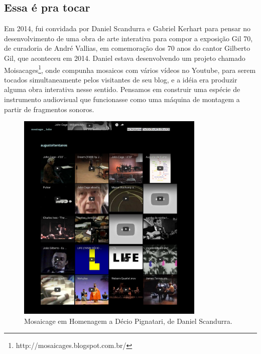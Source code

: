 
\subsection{Essa é pra tocar}
Em 2014, fui convidada por Daniel Scandurra e Gabriel Kerhart para pensar no desenvolvimento de uma obra de arte interativa para compor a exposição Gil 70, de curadoria de André Vallias, em comemoração dos 70 anos do cantor Gilberto Gil, que aconteceu em 2014. Daniel estava desenvolvendo um projeto chamado Moisacages\footnote{http://mosaicages.blogspot.com.br/}, onde compunha mosaicos com vários vídeos no Youtube, para serem tocados simultaneamente pelos visitantes de seu blog, e a idéia era produzir alguma obra interativa nesse sentido. Pensamos em construir uma espécie de instrumento audiovisual que funcionasse como uma máquina de montagem a partir de fragmentos sonoros.

\begin{figure}

\includegraphics[width=0.8\textwidth]{pictures/cap1/mosaicages}
\caption{Mosaicage em Homenagem a Décio Pignatari, de Daniel Scandurra.}
\label{fig:mosaicages}
\end{figure}

